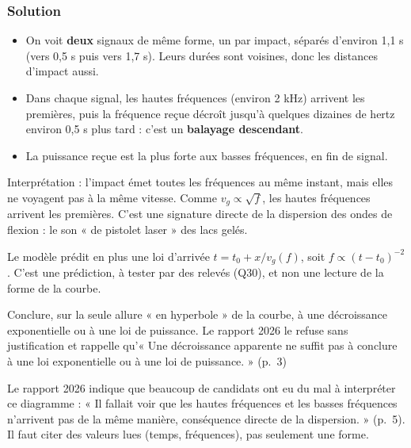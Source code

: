 \documentclass[11pt,a4paper]{article}
\providecommand{\tightlist}{\setlength{\itemsep}{0pt}\setlength{\parskip}{0pt}}
\begin{document}
\hypertarget{solution-28}{%
\subsubsection{Solution}\label{solution-28}}

\begin{itemize}
\tightlist
\item
  On voit \textbf{deux} signaux de même forme, un par impact, séparés d'environ 1,1 s (vers 0,5 s puis vers 1,7 s). Leurs durées sont voisines, donc les distances d'impact aussi.
\item
  Dans chaque signal, les hautes fréquences (environ 2 kHz) arrivent les premières, puis la fréquence reçue décroît jusqu'à quelques dizaines de hertz environ 0,5 s plus tard : c'est un \textbf{balayage descendant}.
\item
  La puissance reçue est la plus forte aux basses fréquences, en fin de signal.
\end{itemize}

Interprétation : l'impact émet toutes les fréquences au même instant, mais elles ne voyagent pas à la même vitesse. Comme \(v_g\propto\sqrt f\), les hautes fréquences arrivent les premières. C'est une signature directe de la dispersion des ondes de flexion : le son « de pistolet laser » des lacs gelés.

Le modèle prédit en plus une loi d'arrivée \(t=t_0+x/v_g(f)\), soit \(f\propto(t-t_0)^{-2}\). C'est une prédiction, à tester par des relevés (Q30), et non une lecture de la forme de la courbe.

\begin{piege}

Conclure, sur la seule allure « en hyperbole » de la courbe, à une décroissance exponentielle ou à une loi de puissance. Le rapport 2026 le refuse sans justification et rappelle qu'« Une décroissance apparente ne suffit pas à conclure à une loi exponentielle ou à une loi de puissance. » (p.~3)

\end{piege}

\begin{jury}

Le rapport 2026 indique que beaucoup de candidats ont eu du mal à interpréter ce diagramme : « Il fallait voir que les hautes fréquences et les basses fréquences n'arrivent pas de la même manière, conséquence directe de la dispersion. » (p.~5). Il faut citer des valeurs lues (temps, fréquences), pas seulement une forme.

\end{jury}
\end{document}
